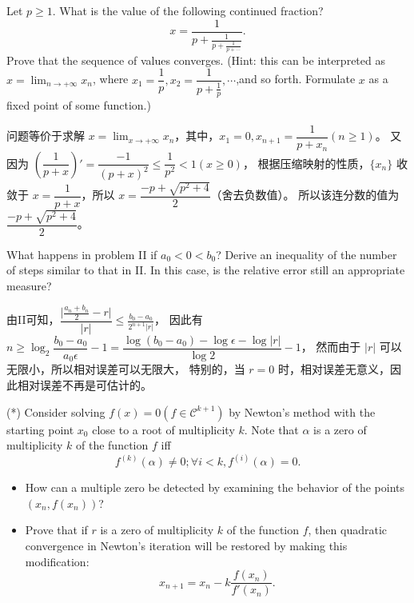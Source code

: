 \documentclass[lang=cn,a4paper,newtx,bibend=bibtex]{elegantpaper}
\begin{document}
\begin{prob}[1.8.1-\textrm{VI}.]
    Let $p\ge 1$. What is the value of the following continued
    fraction?
    \[
        x=\frac{1}{p+\frac{1}{p+\frac{1}{p+\cdots}}}.
        \]
    Prove that the sequence of values converges. (Hint:
    this can be interpreted as $x = \lim_{n\to +\infty} x_n$, where
    $x_1 = \dfrac1p,x_2=\dfrac{1}{p+\frac1p}, \cdots$,and so forth.
    Formulate $x$ as a fixed point of some function.)
\end{prob}
        
\begin{solution}
问题等价于求解 $x = \lim_{x\to +\infty} x_n$，其中，$x_1 = 0, x_{n+1} = \dfrac{1}{p + x_n} (n \ge 1)$。
又因为 $(\dfrac{1}{p+x})'=\dfrac{-1}{(p+x)^2} \le \dfrac{1}{p^2} < 1 (x \ge 0)$，
根据压缩映射的性质，$\{x_n\}$ 收敛于 $ x=\dfrac{1}{p+x}$，所以 $x=\dfrac{-p+\sqrt{p^2+4}}{2}$（舍去负数值）。
所以该连分数的值为 $\dfrac{-p+\sqrt{p^2+4}}{2}$。
\end{solution}

\begin{prob}
    What happens in problem \textrm{II} if $a_0 < 0 < b_0$? Derive
    an inequality of the number of steps similar to that in
    \textrm{II}. In this case, is the relative error still an appropriate
    measure?
\end{prob}
        
\begin{solution}
    由\textrm{II}可知，$\dfrac{\vert\frac{a_n+b_n}{2}-r\vert}{\vert r\vert }\le \frac{b_0-a_0}{2^{n+1}\vert r\vert }$，
    因此有 $n\ge \log_2 {\dfrac{b_0-a_0}{a_0\epsilon}} - 1 = \dfrac{\log(b_0-a_0)-\log \epsilon-\log {\vert r\vert}}{\log 2}-1$，
    然而由于 $\vert r\vert$ 可以无限小，所以相对误差可以无限大，
    特别的，当 $r = 0$ 时，相对误差无意义，因此相对误差不再是可估计的。
\end{solution}

\begin{prob}
    (*) Consider solving $f(x) = 0 (f \in \mathcal{C}^{k+1})$ by Newton’s
method with the starting point $x_0$ close to a root of
multiplicity $k$. Note that $\alpha$ is a zero of multiplicity $k$
of the function $f$ iff
\[f^{(k)}(\alpha) \neq 0; \forall i < k, f^{(i)}(\alpha) = 0.\]
\begin{itemize}
\item How can a multiple zero be detected by examining
the behavior of the points $(x_n, f(x_n))$?
\item Prove that if $r$ is a zero of multiplicity $k$ of the
function $f$, then quadratic convergence in Newton’s iteration will be restored by making this
modification:
\[
    x_{n+1}=x_n-k\dfrac{f(x_n)}{f'(x_n)}.
    \]
\end{itemize}
\end{prob}
        
\end{document}
